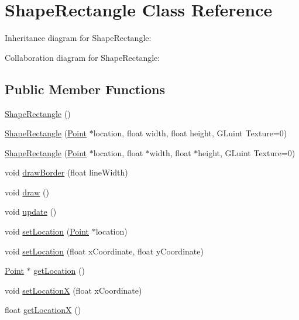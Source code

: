 \hypertarget{class_shape_rectangle}{}\section{Shape\+Rectangle Class Reference}
\label{class_shape_rectangle}


Inheritance diagram for Shape\+Rectangle\+:


Collaboration diagram for Shape\+Rectangle\+:
\subsection*{Public Member Functions}
\begin{DoxyCompactItemize}
\item 
\hyperlink{class_shape_rectangle_a8cdb8cd9d0fa3c64d5a269dd9b8181ac}{Shape\+Rectangle} ()
\item 
\hyperlink{class_shape_rectangle_ad11376a9387ce301abbeb5986261e9a6}{Shape\+Rectangle} (\hyperlink{class_point}{Point} $\ast$location, float width, float height, G\+Luint Texture=0)
\item 
\hyperlink{class_shape_rectangle_aadea0d8e3cc30fb401b587be8f0bb793}{Shape\+Rectangle} (\hyperlink{class_point}{Point} $\ast$location, float $\ast$width, float $\ast$height, G\+Luint Texture=0)
\item 
void \hyperlink{class_shape_rectangle_a7fd691a209b8e73d2849ce8e675f2c9f}{draw\+Border} (float line\+Width)
\item 
void \hyperlink{class_shape_rectangle_a20a7cfe33c50e3adc9ee1f8989458997}{draw} ()
\item 
void \hyperlink{class_shape_rectangle_a27a4f3efb30a8233614afcea472145dd}{update} ()
\item 
void \hyperlink{class_shape_rectangle_ab9f7ab7f3be2f09e46e3790644c414f9}{set\+Location} (\hyperlink{class_point}{Point} $\ast$location)
\item 
void \hyperlink{class_shape_rectangle_a0d123eb4043cb3bad2c7700dc0b35439}{set\+Location} (float x\+Coordinate, float y\+Coordinate)
\item 
\hyperlink{class_point}{Point} $\ast$ \hyperlink{class_shape_rectangle_ad625cedb3495d76cdcc750da474b84ad}{get\+Location} ()
\item 
void \hyperlink{class_shape_rectangle_aaeea81487d18c816bcb158491e44f24a}{set\+Location\+X} (float x\+Coordinate)
\item 
float \hyperlink{class_shape_rectangle_a270b44e1c3580bdc47659d98ff10155f}{get\+Location\+X} ()

\end{DoxyCompactItemize}
